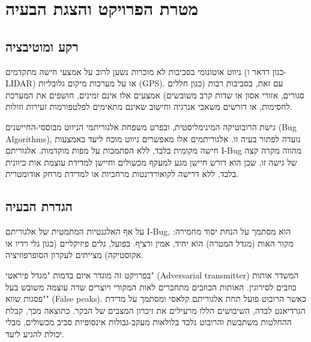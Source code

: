 \documentclass[12pt, a4paper]{article}
\begin{document}

\section{מטרת הפרויקט והצגת הבעיה}

\subsection{רקע ומוטיבציה}
ניווט אוטונומי בסביבות לא מוכרות נשען לרוב על אמצעי חישה מתקדמים (כגון רדאר ו-\textenglish{LIDAR}) או על מערכות מיקום גלובליות (\textenglish{GPS}). עם זאת, בסביבות רבות (כגון חללים סגורים, אזורי אסון או שדות קרב משובשים) אמצעים אלו אינם זמינים, חושפים את המערכת לחסימות, או דורשים משאבי אנרגיה וחישוב שאינם מתאימים לפלטפורמות זעירות וזולות. 

גישת הרובוטיקה המינימליסטית, ובפרט משפחת אלגוריתמי הניווט מבוססי-החיישנים (\textenglish{Bug Algorithms}), נועדה לפתור בעיה זו. אלגוריתמים אלו מאפשרים ניווט מוכח ליעד באמצעות חישה מקומית בלבד, ללא הסתמכות על מפות מוקדמות. אלגוריתם \textenglish{I-Bug} מהווה מקרה קצה של גישה זו, שכן הוא דורש חיישן מגע למעקף מכשולים וחיישן למדידת עוצמת אות כיוונית בלבד, ללא דרישה לקואורדינטות מרחביות או למדידת מרחק אודומטרית.

\subsection{הגדרת הבעיה}
על אף האלגנטיות המתמטית של אלגוריתם \textenglish{I-Bug}, הוא מסתמך על הנחת יסוד מחמירה: מקור האות (מגדל המטרה) הוא יחיד, אמין ורציף. בפועל, גלים פיזיקליים (כגון גלי רדיו או אקוסטיקה) מצייתים לעקרון הסופרפוזיציה. 

בפרויקט זה מוגדר איום בדמות "מגדל פיראטי" (\textenglish{Adversarial transmitter}) המשדר אותות כוזבים לסירוגין. האותות הכוזבים מתחברים לאות המקורי ויוצרים שדה עוצמה משובש בעל "פסגות שווא" (\textenglish{False peaks}). כאשר הרובוט פועל תחת אלגוריתם קלאסי ומסתמך על מדידת הגרדיאנט לבדה, השיבושים הללו מרעילים את זיכרון המצבים של הבקר. כתוצאה מכך, קבלת ההחלטות משתבשת והרובוט נלכד בלולאות מעקב-גבולות אינסופיות סביב מכשולים, מבלי יכולת להגיע ליעד.
\end{document}
